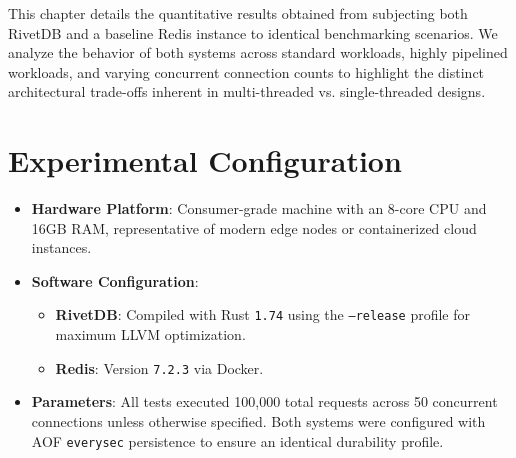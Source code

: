 
This chapter details the quantitative results obtained from subjecting both RivetDB and a baseline Redis instance to identical benchmarking scenarios. We analyze the behavior of both systems across standard workloads, highly pipelined workloads, and varying concurrent connection counts to highlight the distinct architectural trade-offs inherent in multi-threaded vs. single-threaded designs.

\section{Experimental Configuration}

\begin{itemize}[leftmargin=2.5em]
    \item \textbf{Hardware Platform}: Consumer-grade machine with an 8-core CPU and 16GB RAM, representative of modern edge nodes or containerized cloud instances.
    \item \textbf{Software Configuration}: 
      \begin{itemize}
          \item \textbf{RivetDB}: Compiled with Rust \texttt{1.74} using the \texttt{--release} profile for maximum LLVM optimization.
          \item \textbf{Redis}: Version \texttt{7.2.3} via Docker.
      \end{itemize}
    \item \textbf{Parameters}: All tests executed 100,000 total requests across 50 concurrent connections unless otherwise specified. Both systems were configured with AOF \texttt{everysec} persistence to ensure an identical durability profile.
\end{itemize}


